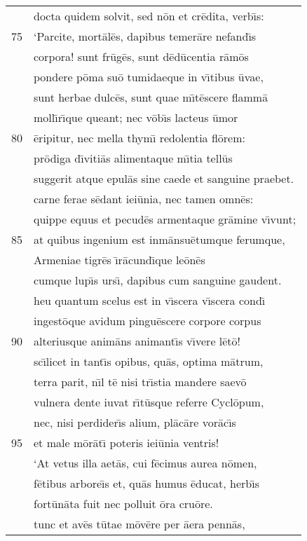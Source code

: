 \documentclass[paper=6in:9in,pagesize=pdftex,
               headinclude=on,footinclude=on,12pt]{scrbook}
\begin{document}
\begin{longtable}[p]{ r l }
 & docta quidem solvit, sed n\=on et cr\=edita, verb\={\i}s:\\ 
75 & \indent `Parcite, mort\=al\=es, dapibus temer\=are nefand\={\i}s\\ 
 & corpora! sunt fr\=ug\=es, sunt d\=ed\=ucentia r\=am\=os\\ 
 & pondere p\=oma su\=o tumidaeque in v\={\i}tibus \=uvae,\\ 
 & sunt herbae dulc\=es, sunt quae m\={\i}t\=escere flamm\=a\\ 
 & moll\={\i}r\={\i}que queant; nec v\=ob\={\i}s lacteus \=umor\\ 
80 & \=eripitur, nec mella thym\={\i} redolentia fl\=orem:\\ 
 & pr\=odiga d\={\i}viti\=as alimentaque m\={\i}tia tell\=us\\ 
 & suggerit atque epul\=as sine caede et sanguine praebet.\\ 
 & carne ferae s\=edant iei\=unia, nec tamen omn\=es:\\ 
 & quippe equus et pecud\=es armentaque gr\=amine v\={\i}vunt;\\ 
85 & at quibus ingenium est inm\=ansu\=etumque ferumque,\\ 
 & Armeniae tigr\=es \={\i}r\=acund\={\i}que le\=on\=es\\ 
 & cumque lup\={\i}s urs\={\i}, dapibus cum sanguine gaudent.\\ 
 & heu quantum scelus est in v\={\i}scera v\={\i}scera cond\={\i}\\ 
 & ingest\=oque avidum pingu\=escere corpore corpus\\ 
90 & alteriusque anim\=ans animant\={\i}s v\={\i}vere l\=et\=o!\\ 
 & sc\={\i}licet in tant\={\i}s opibus, qu\=as, optima m\=atrum,\\ 
 & terra parit, n\={\i}l t\=e nisi tr\={\i}stia mandere saev\=o\\ 
 & vulnera dente iuvat r\={\i}t\=usque referre Cycl\=opum,\\ 
 & nec, nisi perdider\={\i}s alium, pl\=ac\=are vor\=ac\={\i}s\\ 
95 & et male m\=or\=at\={\i} poteris iei\=unia ventris!\\ 
 & \indent `At vetus illa aet\=as, cui f\=ecimus aurea n\=omen,\\ 
 & f\=etibus arbore\={\i}s et, qu\=as humus \=educat, herb\={\i}s\\ 
 & fort\=un\=ata fuit nec polluit \=ora cru\=ore.\\ 
 & tunc et av\=es t\=utae m\=ov\=ere per \=aera penn\=as,\\ 

\end{longtable}
\end{document}
